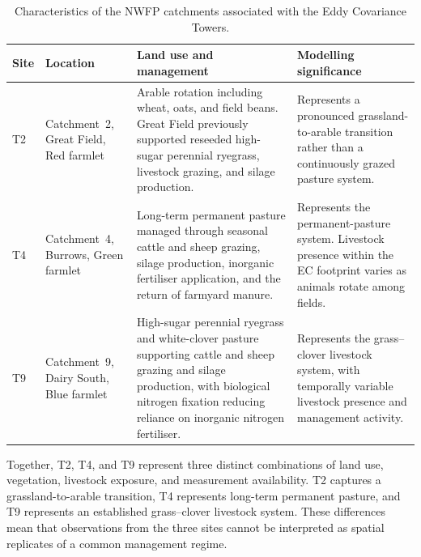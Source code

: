 \begin{table}[htbp]
    \centering
    \small
    \caption{Characteristics of the NWFP catchments associated with the Eddy Covariance Towers.}
    \label{tab:nwfp-catchments}
    \begin{tabular}{
        @{}
        >{\raggedright\arraybackslash}p{}
        >{\raggedright\arraybackslash}p{}
        >{\raggedright\arraybackslash}p{}
        >{\raggedright\arraybackslash}p{}
        @{}
    }
        \toprule
        \textbf{Site} &
        \textbf{Location} &
        \textbf{Land use and management} &
        \textbf{Modelling significance} \\
        \midrule

        T2 &
        Catchment~2, Great Field, Red farmlet &
        Arable rotation including wheat, oats, and field beans. Great Field
        previously supported reseeded high-sugar perennial ryegrass, livestock
        grazing, and silage production. &
        Represents a pronounced grassland-to-arable transition rather than a
        continuously grazed pasture system. \\

        \addlinespace

        T4 &
        Catchment~4, Burrows, Green farmlet &
        Long-term permanent pasture managed through seasonal cattle and sheep
        grazing, silage production, inorganic fertiliser application, and the
        return of farmyard manure. &
        Represents the permanent-pasture system. Livestock presence within the
        EC footprint varies as animals rotate among fields. \\

        \addlinespace

        T9 &
        Catchment~9, Dairy South, Blue farmlet &
        High-sugar perennial ryegrass and white-clover pasture supporting
        cattle and sheep grazing and silage production, with biological nitrogen
        fixation reducing reliance on inorganic nitrogen fertiliser. &
        Represents the grass--clover livestock system, with temporally variable
        livestock presence and management activity. \\

        \bottomrule
    \end{tabular}
\end{table}

Together, T2, T4, and T9 represent three distinct combinations of land use,
vegetation, livestock exposure, and measurement availability. T2 captures a
grassland-to-arable transition, T4 represents long-term permanent pasture, and
T9 represents an established grass--clover livestock system. These differences
mean that observations from the three sites cannot be interpreted as spatial
replicates of a common management regime.

